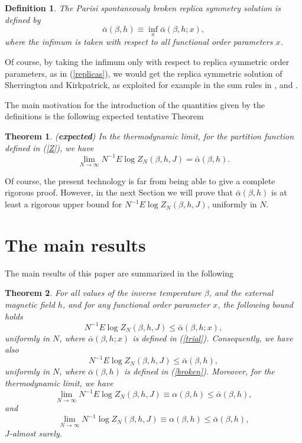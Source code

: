\documentclass[a4paper,12pt]{article}
\newtheorem{theorem}{Theorem}
\newtheorem{definition}{Definition}
\begin{document}
\begin{definition}
The Parisi spontaneously broken replica symmetry solution is defined by
\begin{equation}\label{broken}
\bar\alpha(\beta,h)\equiv \inf_x \bar\alpha(\beta,h;x),
\end{equation}
where the infimum is taken with respect to all functional order parameters 
$x$. 
\end{definition}

Of course, by taking the infimum only with respect to replica symmetric 
order parameters, as in (\ref{replicas}), we would get the replica symmetric 
solution of Sherrington and Kirkpatrick, 
as exploited for example in the sum rules in \cite{Gsum}, 
and \cite{GTquadr}.

The main motivation for the introduction of the quantities given by the 
definitions is the following expected tentative Theorem
\begin{theorem}
\label{dream}
({\bf expected}) In the thermodynamic limit, for the partition function defined in 
(\ref{Z}), we have
$$
\lim_{N\to\infty}N^{-1}E\log Z_{N}(\beta,h,J)=\bar\alpha(\beta,h).
$$
\end{theorem}
Of course, the present technology is  far from being able to give a 
complete rigorous proof. However, in the next Section we will prove that 
$\bar\alpha(\beta,h)$ is at least a rigorous upper bound 
for $N^{-1}E\log Z_{N}(\beta,h,J)$, 
uniformly in $N$.

\section{The main results}

The main results of this paper are summarized in the following
\begin{theorem}
\label{main}
For all values of the inverse temperature $\beta$, and the external 
magnetic field $h$, and for any functional order parameter $x$, the 
following bound holds
$$
N^{-1}E\log Z_{N}(\beta,h,J)\le\bar\alpha(\beta,h;x),
$$
uniformly in $N$, where $\bar\alpha(\beta,h;x)$ is defined in 
(\ref{trial}). Consequently, we have also
$$
N^{-1}E\log Z_{N}(\beta,h,J)\le\bar\alpha(\beta,h),
$$
uniformly in $N$, where $\bar\alpha(\beta,h)$ is defined in 
(\ref{broken}). Moreover, for the thermodynamic limit, we have
$$
\lim_{N\to\infty}N^{-1}E\log Z_{N}(\beta,h,J)\equiv\alpha(\beta,h)\le
\bar\alpha(\beta,h),
$$
and
$$
\lim_{N\to\infty}N^{-1}\log Z_{N}(\beta,h,J)\equiv\alpha(\beta,h)\le
\bar\alpha(\beta,h),
$$
$J$-almost surely.
\end{theorem}
\end{document}

